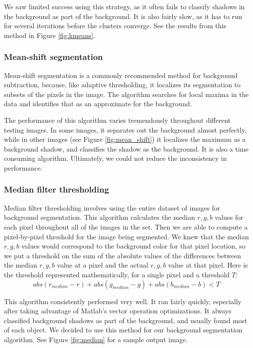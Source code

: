 \documentclass[12pt]{article}
\begin{document}
We saw limited success using this strategy, as it often fails to classify shadows in the background as part of the background. It is also fairly slow, as it has to run for several iterations before the clusters converge. See the results from this method in Figure \ref{fig:kmeans}.

\subsubsection{Mean-shift segmentation}

Mean-shift segmentation is a commonly recommended method for background subtraction, because, like adaptive thresholding, it localizes its segmentation to subsets of the pixels in the image. The algorithm searches for local maxima in the data and identifies that as an approximate for the background.

The performance of this algorithm varies tremendously throughout different testing images. In some images, it separates out the background almost perfectly, while in other images (see Figure \ref{fig:mean_shift}) it localizes the maximum as a background shadow, and classifies the shadow as the background. It is also a time consuming algorithm. Ultimately, we could not reduce the inconsistency in performance.

\subsubsection{Median filter thresholding}

Median filter thresholding involves using the entire dataset of images for background segmentation. This algorithm calculates the median $r,g,b$ values for each pixel throughout all of the images in the set. Then we are able to compute a pixel-by-pixel threshold for the image being segmented. We knew that the median $r,g,b$ values would correspond to the background color for that pixel location, so we put a threshold on the sum of the absolute values of the differences between the median $r,g,b$ value at a pixel and the actual $r,g,b$ value at that pixel. Here is the threshold represented mathematically, for a single pixel and a threshold $T$:
\[abs(r_{median}-r)+abs(g_{median}-g)+abs(b_{median}-b)<T\]

This algorithm consistently performed very well. It ran fairly quickly, especially after taking advantage of Matlab's vector operation optimizations. It always classified background shadows as part of the background, and usually found most of each object. We decided to use this method for our background segmentation algorithm. See Figure \ref{fig:median} for a sample output image.
\end{document}
